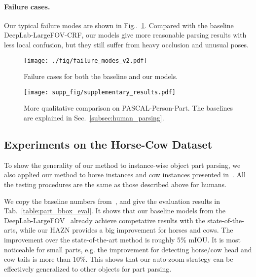 \documentclass[runningheads]{llncs}
\makeatletter
\newcommand{\figref}[1]{Fig\onedot~\ref{#1}}
\DeclareRobustCommand\onedot{\futurelet\@let@token\@onedot}
\def\@onedot{\ifx\@let@token.\else.\null\fi\xspace}
\makeatother
\begin{document}
\paragraph{Failure cases.} Our typical failure modes are shown in \figref{fig:seg_image_fail}. Compared with the baseline DeepLab-LargeFOV-CRF, our models give more reasonable parsing results with less local confusion, but they still suffer from heavy occlusion and unusual poses.

\begin{figure}[!t]
\centering
\texttt{[image: ./fig/failure\_modes\_v2.pdf]}
\caption{Failure cases for both the baseline and our models.}
\vspace{-1.2\baselineskip}
\label{fig:seg_image_fail}
\end{figure}


\begin{figure}[!htbp]
\centering
\hspace*{-0.4cm}
\texttt{[image: supp\_fig/supplementary\_results.pdf]}
\caption{More qualitative comparison on PASCAL-Person-Part. The baselines are explained in Sec.~\ref{subsec:human_parsing}.}
\label{fig:human_res}
\end{figure}




\subsection{Experiments on the Horse-Cow Dataset}
\label{sec:horses}
\vspace{-0.3\baselineskip}
To show the generality of our method to instance-wise object part parsing, we also applied our method to horse instances and cow instances presented in~\cite{wang2014semantic}. All the testing procedures are the same as those described above for humans.
 
We copy the baseline numbers from~\cite{wang2015joint}, and give the evaluation results in Tab.~\ref{table:part_bbox_eval}. It shows that our baseline models from the DeepLab-LargeFOV~\cite{chen2014semantic} already achieve competative results with the state-of-the-arts, while our HAZN provides a big improvement for horses and cows. The improvement over the state-of-the-art method \cite{wang2015joint} is roughly 5\% mIOU. It is most noticeable for small parts, e.g. the improvement for detecting horse/cow head and cow tails is more than 10$\%$. This shows that our auto-zoom strategy can be effectively generalized to other objects for part parsing. 
\end{document}
